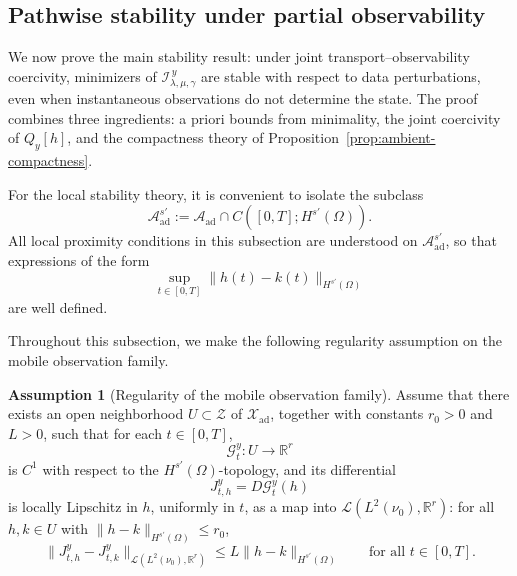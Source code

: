 \documentclass{article}
\theoremstyle{definition}
\newtheorem{assumption}[theorem]{Assumption}
\begin{document}
\subsection{Pathwise stability under partial observability}
\label{subsec:pathwise-stability}

We now prove the main stability result: under joint transport--observability coercivity, minimizers
of \(\mathcal I_{\lambda,\mu,\gamma}^{\,y}\) are stable with respect to data perturbations, even when
instantaneous observations do not determine the state. The proof combines three ingredients: a
priori bounds from minimality, the joint coercivity of \(Q_y[h]\), and the compactness theory of
Proposition~\ref{prop:ambient-compactness}.

For the local stability theory, it is convenient to isolate the subclass
\[
    \mathcal A_{\mathrm{ad}}^{s'}
    :=
    \mathcal A_{\mathrm{ad}} \cap C([0,T];H^{s'}(\Omega)).
\]
All local proximity conditions in this subsection are understood on
\(\mathcal A_{\mathrm{ad}}^{s'}\), so that expressions of the form
\[
    \sup_{t\in[0,T]}\|h(t)-k(t)\|_{H^{s'}(\Omega)}
\]
are well defined.

Throughout this subsection, we make the following regularity assumption on the mobile observation
family.

\begin{assumption}[Regularity of the mobile observation family]
    \label{ass:observation-regularity}
    Assume that there exists an open neighborhood \(U\subset \mathcal Z\) of
    \(\mathcal X_{\mathrm{ad}}\), together with constants \(r_0>0\) and \(L>0\), such that for each
    \(t\in[0,T]\),
    \[
        \mathcal G_t^y:U\to\mathbb R^r
    \]
    is \(C^1\) with respect to the \(H^{s'}(\Omega)\)-topology, and its differential
    \[
        J_{t,h}^{y}=D\mathcal G_t^y(h)
    \]
    is locally Lipschitz in \(h\), uniformly in \(t\), as a map into
    \(\mathcal L(L^2(\nu_0),\mathbb R^r)\): for all \(h,k\in U\) with
    \(\|h-k\|_{H^{s'}(\Omega)}\le r_0\),
    \begin{equation}
        \label{eq:J-lipschitz}
        \|J_{t,h}^{y}-J_{t,k}^{y}\|_{\mathcal L(L^2(\nu_0),\mathbb R^r)}
        \le
        L\|h-k\|_{H^{s'}(\Omega)}
        \qquad\text{for all } t\in[0,T].
    \end{equation}
\end{assumption}
\end{document}
